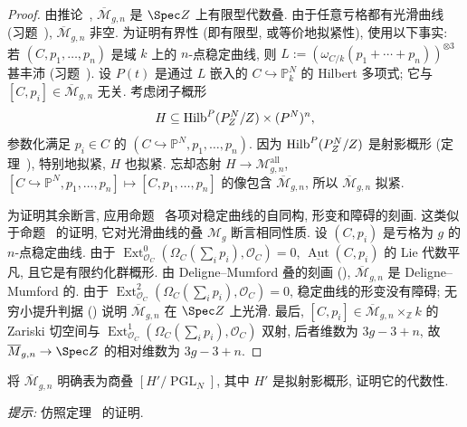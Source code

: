 \begin{proof}
由推论~, $\overline{\mathcal M}_{g,\allowbreak n}$ 是 $\Spec\mathbb Z$ 上有限型代数叠. 由于任意亏格都有光滑曲线 (习题~), $\overline{\mathcal M}_{g,\allowbreak n}$ 非空. 为证明有界性 (即有限型, 或等价地拟紧性), 使用以下事实: 若 $(C,\allowbreak p_1,\allowbreak \ldots,\allowbreak p_n)$ 是域 $k$ 上的 $n$-点稳定曲线, 则 $L:=(\omega_{C/k}(p_1+\cdots+p_n))^{\otimes3}$ 甚丰沛 (习题~). 设 $P(t)$ 是通过 $L$ 嵌入的 $C\hookrightarrow\mathbb P^N_k$ 的 Hilbert 多项式; 它与 $[C,\allowbreak p_i]\in\overline{\mathcal M}_{g,\allowbreak n}$ 无关. 考虑闭子概形
\[
H\subseteq\operatorname{Hilb}^P(P^N_{Z}/Z)\times(P^N)^n,
\]
参数化满足 $p_i\in C$ 的 $(C\hookrightarrow\mathbb P^N,\allowbreak p_1,\allowbreak \ldots,\allowbreak p_n)$. 因为 $\operatorname{Hilb}^P(P^N_{Z}/Z)$ 是射影概形 (定理~), 特别地拟紧, $H$ 也拟紧. 忘却态射 $H\to\mathcal M_{g,\allowbreak n}^{\mathrm{all}}$, $[C\hookrightarrow\mathbb P^N,\allowbreak p_1,\allowbreak \ldots,\allowbreak p_n]\mapsto[C,\allowbreak p_1,\allowbreak \ldots,\allowbreak p_n]$ 的像包含 $\overline{\mathcal M}_{g,\allowbreak n}$, 所以 $\overline{\mathcal M}_{g,\allowbreak n}$ 拟紧.

为证明其余断言, 应用命题~ 各项对稳定曲线的自同构, 形变和障碍的刻画. 这类似于命题~ 的证明, 它对光滑曲线的叠 $\mathcal M_g$ 断言相同性质. 设 $(C,\allowbreak p_i)$ 是亏格为 $g$ 的 $n$-点稳定曲线. 由于 $\operatorname{Ext}^0_{\mathcal O_C}(\Omega_C(\sum_i p_i),\allowbreak \mathcal O_C)=0$, $\underline{\operatorname{Aut}}(C,\allowbreak p_i)$ 的 Lie 代数平凡, 且它是有限约化群概形. 由 Deligne--Mumford 叠的刻画 (), $\overline{\mathcal M}_{g,\allowbreak n}$ 是 Deligne--Mumford 的. 由于 $\operatorname{Ext}^2_{\mathcal O_C}(\Omega_C(\sum_i p_i),\allowbreak \mathcal O_C)=0$, 稳定曲线的形变没有障碍; 无穷小提升判据 () 说明 $\overline{\mathcal M}_{g,\allowbreak n}$ 在 $\Spec\mathbb Z$ 上光滑. 最后, $[C,\allowbreak p_i]\in\overline{\mathcal M}_{g,\allowbreak n}\times_{\mathbb Z}k$ 的 Zariski 切空间与 $\operatorname{Ext}^1_{\mathcal O_C}(\Omega_C(\sum_i p_i),\allowbreak \mathcal O_C)$ 双射, 后者维数为 $3g-3+n$, 故 $\overline{\mathcal M}_{g,\allowbreak n}\to\Spec\mathbb Z$ 的相对维数为 $3g-3+n$.
\end{proof}
\begin{exercise}\label{src:6.4.17}
将 $\overline{\mathcal M}_{g,\allowbreak n}$ 明确表为商叠 $[H'/\operatorname{PGL}_N]$, 其中 $H'$ 是拟射影概形, 证明它的代数性.

\textit{提示:} 仿照定理~ 的证明.
\end{exercise}
